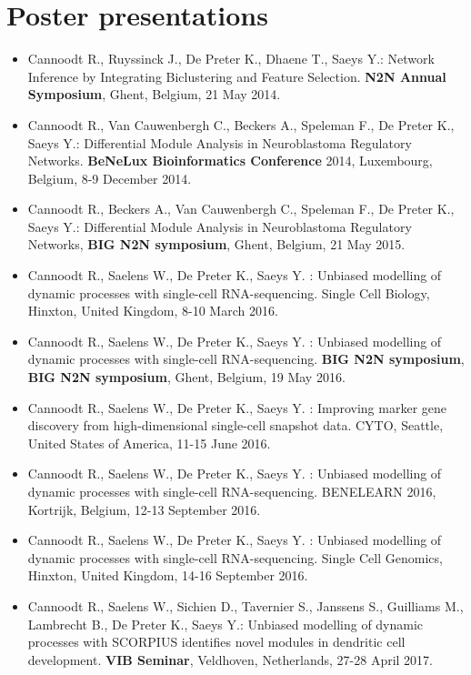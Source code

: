 \section{Poster presentations}

\begin{itemize}
  \item Cannoodt R., Ruyssinck J., De Preter K., Dhaene T., Saeys Y.: Network Inference by Integrating Biclustering and Feature Selection. \textbf{N2N Annual Symposium}, Ghent, Belgium, 21 May 2014.
  \item Cannoodt R., Van Cauwenbergh C., Beckers A., Speleman F., De Preter K., Saeys Y.: Differential Module Analysis in Neuroblastoma Regulatory Networks. \textbf{BeNeLux Bioinformatics Conference} 2014, Luxembourg, Belgium, 8-9 December 2014.
  \item Cannoodt R., Beckers A., Van Cauwenbergh C., Speleman F., De Preter K., Saeys Y.: Differential Module Analysis in Neuroblastoma Regulatory Networks, \textbf{BIG N2N symposium}, Ghent, Belgium, 21 May 2015.
  \item Cannoodt R., Saelens W., De Preter K., Saeys Y. : Unbiased modelling of dynamic processes with single-cell RNA-sequencing. Single Cell Biology, Hinxton, United Kingdom, 8-10 March 2016.
  \item Cannoodt R., Saelens W., De Preter K., Saeys Y. : Unbiased modelling of dynamic processes with single-cell RNA-sequencing. \textbf{BIG N2N symposium}, \textbf{BIG N2N symposium}, Ghent, Belgium, 19 May 2016.
  \item Cannoodt R., Saelens W., De Preter K., Saeys Y. : Improving marker gene discovery from high-dimensional single-cell snapshot data. CYTO, Seattle, United States of America, 11-15 June 2016.
  \item Cannoodt R., Saelens W., De Preter K., Saeys Y. : Unbiased modelling of dynamic processes with single-cell RNA-sequencing. BENELEARN 2016, Kortrijk, Belgium, 12-13 September 2016.
  \item Cannoodt R., Saelens W., De Preter K., Saeys Y. : Unbiased modelling of dynamic processes with single-cell RNA-sequencing. Single Cell Genomics, Hinxton, United Kingdom, 14-16 September 2016.
  \item Cannoodt R., Saelens W., Sichien D., Tavernier S., Janssens S., Guilliams M., Lambrecht B., De Preter K., Saeys Y.: Unbiased modelling of dynamic processes with SCORPIUS identifies novel modules in dendritic cell development. \textbf{VIB Seminar}, Veldhoven, Netherlands, 27-28 April 2017.

\end{itemize}
